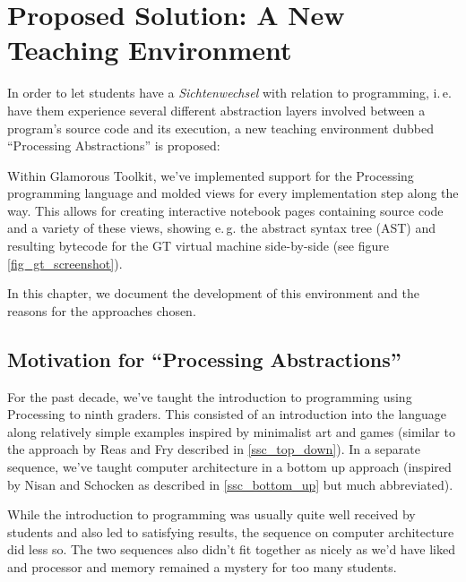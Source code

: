 
\chapter{Proposed Solution: A New Teaching Environment} \label{ch_pa}

In order to let students have a \emph{Sichtenwechsel} with relation to programming, i.\,e. have them experience several different abstraction layers involved between a program's source code and its execution, a new teaching environment dubbed ``Processing Abstractions'' is proposed:

Within Glamorous Toolkit, we've implemented support for the Processing programming language and molded views for every implementation step along the way. This allows for creating interactive notebook pages containing source code and a variety of these views, showing e.\,g. the abstract syntax tree (AST) and resulting bytecode for the GT virtual machine side-by-side (see figure \ref{fig_gt_screenshot}).

In this chapter, we document the development of this environment and the reasons for the approaches chosen.


\section{Motivation for ``Processing Abstractions''}

For the past decade, we've taught the introduction to programming using Processing to ninth graders. This consisted of an introduction into the language along relatively simple examples inspired by minimalist art and games (similar to the approach by Reas and Fry \cite{Rea14} described in \ref{ssc_top_down}). In a separate sequence, we've taught computer architecture in a bottom up approach (inspired by Nisan and Schocken \cite{Nis21} as described in \ref{ssc_bottom_up} but much abbreviated).

While the introduction to programming was usually quite well received by students and also led to satisfying results, the sequence on computer architecture did less so. The two sequences also didn't fit together as nicely as we'd have liked and processor and memory remained a mystery for too many students.

